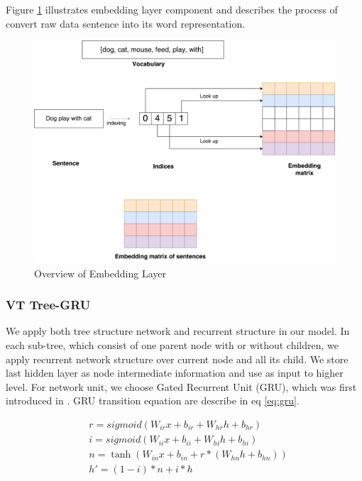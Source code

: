 Figure \ref{fig:embeddinglayer} illustrates embedding layer component and describes the process of convert raw data sentence into its word representation.

\begin{figure}[H]
	\centering
	\includegraphics[width=0.9\linewidth]{figure/embeddinglayer.pdf}
	\caption[Overview of embedding layer]{Overview of Embedding Layer}
	\label{fig:embeddinglayer}
\end{figure}



\subsubsection{VT Tree-GRU}
We apply both tree structure network and recurrent structure in our model. In each sub-tree, which consist of one parent node with or without children, we apply recurrent network structure over current node and all its child. We store last hidden layer as node intermediate information and use as input to higher level. For network unit, we choose Gated Recurrent Unit (GRU), which was first introduced in \cite{cho2014learning}. GRU transition equation are describe in eq \ref{eq:gru}. 

\begin{equation}
\label{eq:gru}
\begin{aligned}
&r = sigmoid(W_{ir} x + b_{ir} + W_{hr} h + b_{hr}) \\
&i = sigmoid(W_{ii} x + b_{ii} + W_{hi} h + b_{hi}) \\
&n = \tanh(W_{in} x + b_{in} + r * (W_{hn} h + b_{hn})) \\
&h' = (1 - i) * n + i * h\\
\end{aligned}
\end{equation}

